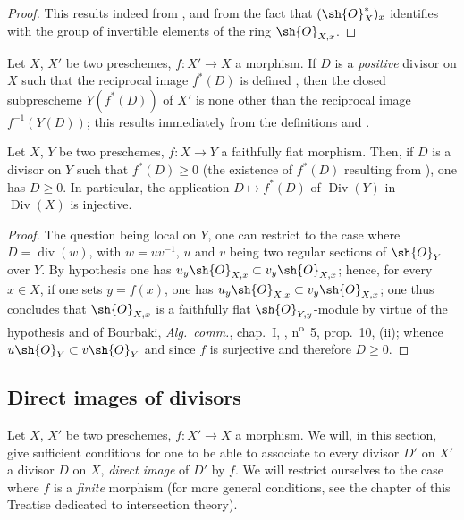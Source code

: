 \begin{proof}
This results indeed from ,  and from the fact that $(\sh{O}_X^*)_x$ identifies with the group of invertible elements of the ring $\sh{O}_{X,x}$.
\end{proof}

\begin{env}[21.4.7]
\label{IV.21.4.7}
Let $X$, $X'$ be two preschemes, $f:X'\to X$ a morphism.
If $D$ is a \emph{positive} divisor on $X$ such that the reciprocal image $f^*(D)$ is defined , then the closed subprescheme $Y(f^*(D))$ of $X'$ is none other than the reciprocal image $f^{-1}(Y(D))$;
this results immediately from the definitions  and .
\end{env}

\begin{proposition}[21.4.8]
\label{IV.21.4.8}
Let $X$, $Y$ be two preschemes, $f:X\to Y$ a faithfully flat morphism.
Then, if $D$ is a divisor on $Y$ such that $f^*(D)\geq 0$ (the existence of $f^*(D)$ resulting from ), one has $D\geq 0$.
In particular, the application $D\mapsto f^*(D)$ of $\operatorname{Div}(Y)$ in $\operatorname{Div}(X)$ is injective.
\end{proposition}

\begin{proof}
The question being local on $Y$, one can restrict to the case where $D=\operatorname{div}(w)$, with $w=uv^{-1}$, $u$ and $v$ being two regular sections of $\sh{O}_Y$ over $Y$.
By hypothesis one has $u_y\sh{O}_{X,x}\subset v_y\sh{O}_{X,x}$;
hence, for every $x\in X$, if one sets $y=f(x)$, one has $u_y\sh{O}_{X,x}\subset v_y\sh{O}_{X,x}$;
one thus concludes that $\sh{O}_{X,x}$ is a faithfully flat $\sh{O}_{Y,y}$-module by virtue of the hypothesis and of Bourbaki, \emph{Alg.~comm.}, chap.~I, , n\textsuperscript{o}~5, prop.~10, (ii);
whence $u\sh{O}_Y\subset v\sh{O}_Y$ and since $f$ is surjective and therefore $D\geq 0$.
\end{proof}

\subsection{Direct images of divisors}
\label{IV.21.5}

\begin{env}[21.5.1]
\label{IV.21.5.1}
Let $X$, $X'$ be two preschemes, $f:X'\to X$ a morphism.
We will, in this section, give sufficient conditions for one to be able to associate to every divisor $D'$ on $X'$ a divisor $D$ on $X$, \emph{direct image} of $D'$ by $f$.
We will restrict ourselves to the case where $f$ is a \emph{finite} morphism (for more general conditions, see the chapter of this Treatise dedicated to intersection theory).
\end{env}


